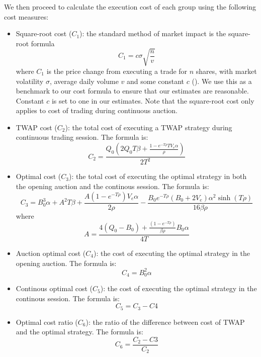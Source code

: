 \documentclass{article}
\begin{document}
We then proceed to calculate the execution cost of each group using the following cost measures:
\begin{itemize}
  \item Square-root cost ($C_1$): the standard method of market impact is the square-root formula
        \[
          C_1 = c \sigma \sqrt{\frac{n}{v}}
        \]
        where $C_1$ is the price change from executing a trade for $n$ shares, with market volatility $\sigma$, average daily volume $v$ and some constant $c$ (\cite{Toth2011}). We use this as a benchmark to our cost formula to ensure that our estimates are reasonable. Constant $c$ is set to one in our estimates. Note that the square-root cost only applies to cost of trading during continuous auction.
  \item TWAP cost ($C_2$): the total cost of executing a TWAP strategy during continuous trading session. The formula is:
        \[
          C_2 = \frac{Q_0 (2 Q_0 T \beta + \frac{1-e^{-T \rho} T V_e \alpha}{\rho})}{2 T^2}
        \]
  \item Optimal cost ($C_3$): the total cost of executing the optimal strategy in both the opening auction and the continous session. The formula is:
        \[
          C_3 = B_0^3 \alpha + A^2 T \beta + \frac{A (1-e^{-T \rho}) V_e \alpha}{2 \rho} - \frac{B_0 e^{-T \rho} (B_0 + 2 V_e) \alpha^2 \sinh(T \rho)}{16 \beta \rho}
        \]
        where
        \[
          A =   \frac{4 (Q_0 - B_0) + \frac{(1 - e^{-T \rho})}{\beta \rho} B_0 \alpha} {4 T}
        \]
  \item Auction optimal cost ($C_4$): the cost of executing the optimal strategy in the opening auction. The formula is:
        \[
          C_4 = B_0^2 \alpha
        \]
  \item Continous optimal cost ($C_5$): the cost of executing the optimal strategy in the continous session. The formula is:
        \[
          C_5 = C_3 - C4
        \]
  \item Optimal cost ratio ($C_6$): the ratio of the difference between cost of TWAP and the optimal strategy. The formula is:
        \[
          C_6 = \frac{C_2 - C3}{C_2}
        \]
\end{itemize}
\end{document}
